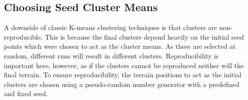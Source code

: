 \subsection{Choosing Seed Cluster Means} \label{subsec:init_clusters}

A downside of classic K-means clustering techniques is that clusters are non-reproducible. This is because the final clusters depend heavily on the initial seed points which were chosen to act as the cluster means. As these are selected at random, different runs will result in different clusters. Reproducibility is important here, however, as if the clusters cannot be reproduced neither will the final terrain. To ensure reproducibility, the terrain positions to act as the initial clusters are chosen using a pseudo-random number generator with a predefined and fixed seed.
